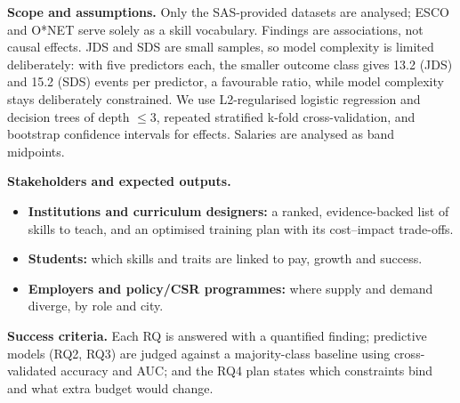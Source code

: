 \documentclass[12pt,a4paper]{article}
\begin{document}
\vspace{6pt}
\noindent\textbf{Scope and assumptions.}
Only the SAS-provided datasets are analysed; ESCO and O*NET serve solely as a skill vocabulary.
Findings are associations, not causal effects. JDS and SDS are small samples, so model
complexity is limited deliberately: with five predictors each, the smaller outcome class gives
13.2 (JDS) and 15.2 (SDS) events per predictor, a favourable ratio, while model complexity
stays deliberately constrained. We use
L2-regularised logistic regression and decision trees of depth $\le 3$, repeated stratified
k-fold cross-validation, and bootstrap confidence intervals for effects. Salaries are analysed
as band midpoints.

\vspace{4pt}
\noindent\textbf{Stakeholders and expected outputs.}
\begin{itemize}
  \item \textbf{Institutions and curriculum designers:} a ranked, evidence-backed list of skills
        to teach, and an optimised training plan with its cost--impact trade-offs.
  \item \textbf{Students:} which skills and traits are linked to pay, growth and success.
  \item \textbf{Employers and policy/CSR programmes:} where supply and demand diverge, by role and city.
\end{itemize}

\vspace{4pt}
\noindent\textbf{Success criteria.}
Each RQ is answered with a quantified finding; predictive models (RQ2, RQ3) are judged against
a majority-class baseline using cross-validated accuracy and AUC; and the RQ4 plan states which
constraints bind and what extra budget would change.
\end{document}
